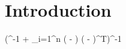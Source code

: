 \documentclass{article}
\author{John Min}
\begin{document}
\section{Introduction}

\left(^{-1} + \sum_{i=1}^n ( - \boldsymbol\mu) ( - \boldsymbol\mu)^T\right)^{-1}
\end{document}
